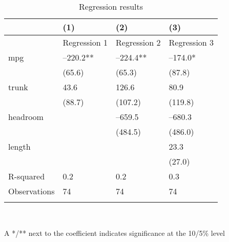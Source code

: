 \documentclass{article}
\begin{document}
\begin{table}[tbp] \centering
{}

\caption{Regression results}
\begin{tabularx}{\linewidth}{@{}lCCC@{}}

\toprule
&{(1)}&{(2)}&{(3)} \tabularnewline \midrule
{}&{Regression 1}&{Regression 2}&{Regression 3} \tabularnewline
\midrule \addlinespace[2ex]
mpg&--220.2**&--224.4**&--174.0* \tabularnewline
&(65.6)&(65.3)&(87.8) \tabularnewline
trunk&43.6&126.6&80.9 \tabularnewline
&(88.7)&(107.2)&(119.8) \tabularnewline
headroom&&--659.5&--680.3 \tabularnewline
&&(484.5)&(486.0) \tabularnewline
length&&&23.3 \tabularnewline
&&&(27.0) \tabularnewline
\midrule R-squared&0.2&0.2&0.3 \tabularnewline
Observations&74&74&74 \tabularnewline
\bottomrule \addlinespace[\belowrulesep]

\end{tabularx}
\\ \parbox{\linewidth}{\footnotesize A */** next to the coefficient indicates significance at the 10/5\% level}
\end{table}
\end{document}
